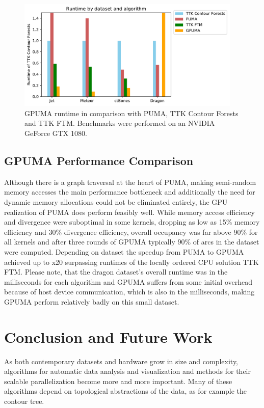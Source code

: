 \documentclass{scrartcl}
\begin{document}
\begin{figure}[h]
\centering
\includegraphics[width=0.95\textwidth]{figures/gruntime.pdf}
\caption{GPUMA runtime in comparison with PUMA, TTK Contour Forests and TTK FTM. Benchmarks were performed on an NVIDIA GeForce GTX 1080.}
\label{fig:runtime}
\end{figure}


\subsection{GPUMA Performance Comparison}
Although there is a graph traversal at the heart of PUMA, making semi-random memory accesses the main performance bottleneck and additionally the need for dynamic memory allocations could not be eliminated entirely, the GPU realization of PUMA does perform feasibly well. While memory access efficiency and divergence were suboptimal in some kernels, dropping as low as 15\% memory efficiency and 30\% divergence efficiency, overall occupancy was far above 90\% for all kernels and after three rounds of GPUMA typically 90\% of arcs in the dataset were computed. Depending on dataset the speedup from PUMA to GPUMA achieved up to x20 surpassing runtimes of the locally ordered CPU solution TTK FTM. Please note, that the dragon dataset's overall runtime was in the milliseconds for each algorithm and GPUMA suffers from some initial overhead because of host device communication, which is also in the milliseconds, making GPUMA perform relatively badly on this small dataset.


\section{Conclusion and Future Work}
As both contemporary datasets and hardware grow in size and complexity, algorithms for automatic data analysis and visualization and methods for their scalable parallelization become more and more important. Many of these algorithms depend on topological abstractions of the data, as for example the contour tree. 
\end{document}
